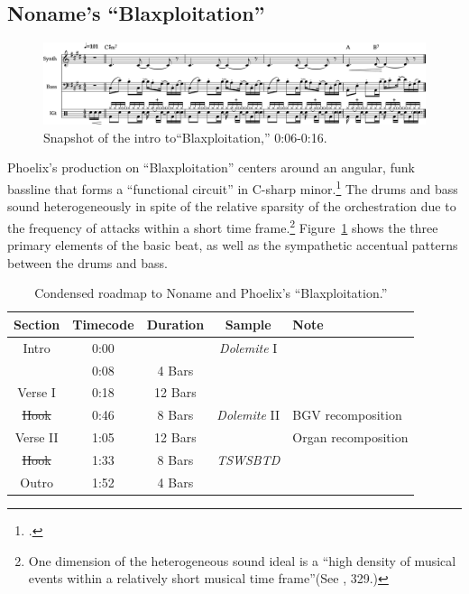 \subsection*{\centering Noname's ``Blaxploitation''}

\begin{figure}[ht]
    \centering
    \includegraphics[width=\textwidth]{images/figures/chp 02/006016blaxintro.pdf}
    \caption{Snapshot of the intro to``Blaxploitation,'' 0:06-0:16.}
    \label{fig:blaxploitationintro}
\end{figure}

Phoelix's production on ``Blaxploitation'' centers around an angular, funk bassline that forms a ``functional circuit'' in C-sharp minor.\footnote{\cite{kyleadamsHarmonicSyntacticMotivic2020}.} The drums and bass sound heterogeneously in spite of the relative sparsity of the orchestration due to the frequency of attacks within a short time frame.\footnote{One dimension of the heterogeneous sound ideal is a ``high density of musical events within a relatively short musical time frame''(See \cite{ollywilsonHeterogeneousSoundIdeal1992}, 329.)} Figure~\ref{fig:blaxploitationintro} shows the three primary elements of the basic beat, as well as the sympathetic accentual patterns between the drums and bass.

\begin{table}[ht]
    \centering
    \begin{tabular}{|c|c|c|c|l|}
         \hline
        Section     & Timecode & Duration    & Sample               & Note \\ \hline
        Intro       & 0:00     &             & \textit{Dolemite} I  & \\ \hline
                    & 0:08     & 4 Bars      &                      & \\ \hline
        Verse I     & 0:18     & 12 Bars     &                      & \\ \hline
        \sout{Hook} & 0:46     & 8 Bars      & \textit{Dolemite} II & BGV recomposition \\ \hline
        Verse II    & 1:05     & 12 Bars     &                      & Organ recomposition \\ \hline
        \sout{Hook} & 1:33     & 8 Bars      & \textit{TSWSBTD}     & \\ \hline
        Outro       & 1:52     & 4 Bars      &                      & \\ \hline
    \end{tabular}
    \caption{Condensed roadmap to Noname and Phoelix's ``Blaxploitation.''}
    \label{tab:blaxploitation}
\end{table}

